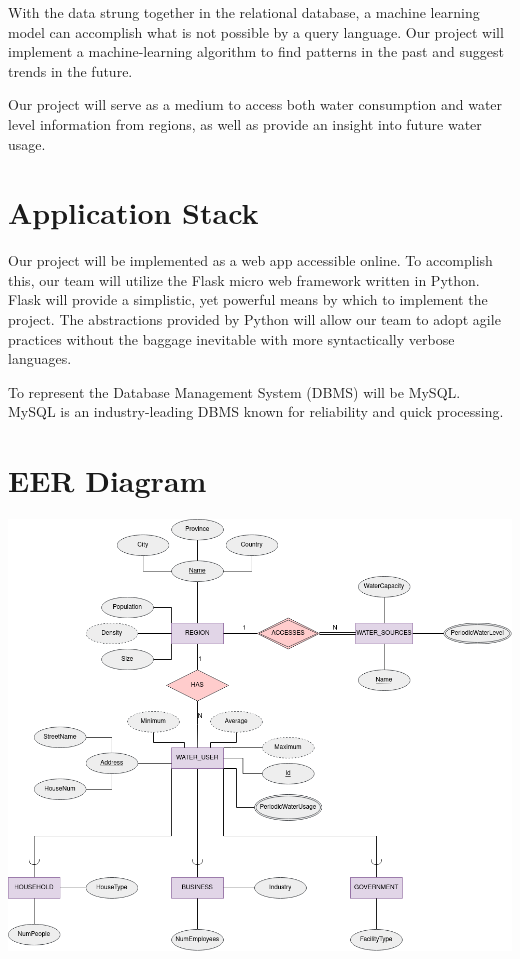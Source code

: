 \documentclass{article}
\begin{document}
With the data strung together in the relational database, a machine learning model can accomplish what is not possible by a query language. Our project will implement a machine-learning algorithm to find patterns in the past and suggest trends in the future.

Our project will serve as a medium to access both water consumption and water level information from regions, as well as provide an insight into future water usage.


\section{Application Stack}
Our project will be implemented as a web app accessible online. To accomplish this, our team will utilize the Flask micro web framework written in Python. Flask will provide a simplistic, yet powerful means by which to implement the project. The abstractions provided by Python will allow our team to adopt agile practices without the baggage inevitable with more syntactically verbose languages.

To represent the Database Management System (DBMS) will be MySQL. MySQL is an industry-leading DBMS known for reliability and quick processing.

\section{EER Diagram}

\includegraphics[width=\linewidth]{UML_Diagram.png}
\end{document}
